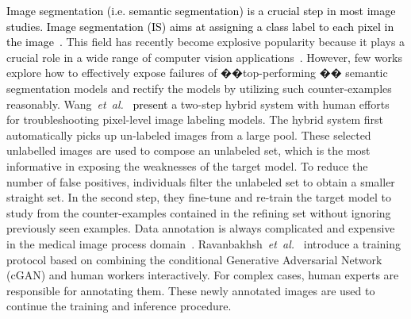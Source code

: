 \documentclass{article}
\newcommand\etal{\emph{et~al.}}
\newcommand{\ZJH}[1]{\textcolor{black}{#1}}
\begin{document}
\ZJH{Image segmentation (i.e. semantic segmentation) is a crucial step in most image studies. Image segmentation (IS) aims at assigning a class label to each pixel in the image~\cite{minaee2021image}.} This field has recently become explosive popularity because it plays a crucial role in a wide range of computer vision applications~\cite{badrinarayanan2017segnet}. However, few works explore how to effectively expose failures of ��top-performing �� semantic segmentation models and rectify the models by utilizing such counter-examples reasonably. Wang~\etal~\cite{wang2020efficiently} \ZJH{present} a two-step hybrid system with human efforts for troubleshooting pixel-level image labeling models. The hybrid system first automatically picks up un-labeled images from a large pool. These selected unlabelled images are used to compose an unlabeled set, which is the most informative in exposing the weaknesses of the target model. To reduce the number of false positives, individuals filter the unlabeled set to obtain a smaller straight set. In the second step, they fine-tune and re-train the target model to study from the counter-examples contained in the refining set without ignoring previously seen examples. Data annotation is always complicated and expensive in the medical image process domain~\cite{taleb2021multimodal}. Ravanbakhsh~\etal~\cite{ravanbakhsh2020human} introduce a training protocol based on combining the conditional Generative Adversarial Network (cGAN) and human workers interactively. For complex cases, human experts are responsible for annotating them. These newly annotated images are used to continue the training and inference procedure.
\end{document}
